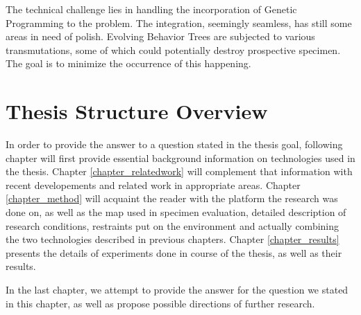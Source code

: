 The technical challenge lies in handling the incorporation of Genetic Programming to the problem. The integration, seemingly seamless, has still some areas in need of polish. Evolving Behavior Trees are subjected to various transmutations, some of which could potentially destroy prospective specimen. The goal is to minimize the occurrence of this happening.

\section{Thesis Structure Overview}
In order to provide the answer to a question stated in the thesis goal, following chapter will first provide essential background information on technologies used in the thesis. Chapter \ref{chapter_relatedwork} will complement that information with recent developements and related work in appropriate areas. Chapter \ref{chapter_method} will acquaint the reader with the platform the research was done on, as well as the map used in specimen evaluation, detailed description of research conditions, restraints put on the environment and actually combining the two technologies described in previous chapters. Chapter \ref{chapter_results} presents the details of experiments done in course of the thesis, as well as their results.

In the last chapter, we attempt to provide the answer for the question we stated in this chapter, as well as propose possible directions of further research.
